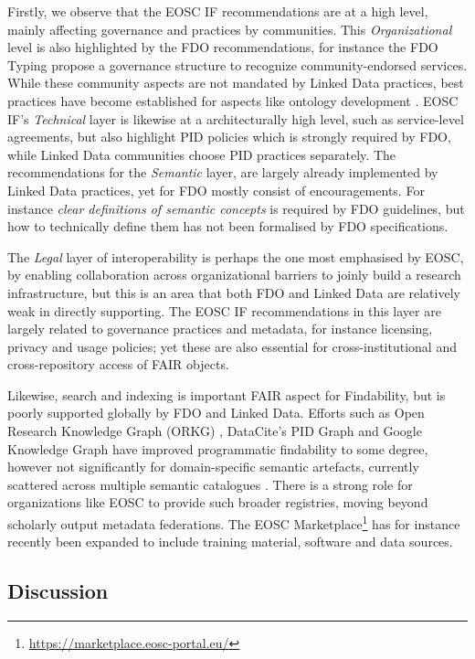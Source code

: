 Firstly, we observe that the EOSC IF recommendations are at a high level, mainly affecting governance and practices by communities. This \emph{Organizational} level is also highlighted by the FDO recommendations, for instance the FDO Typing \cite{Lannom 2022c} propose a governance structure to recognize community-endorsed services. While these community aspects are not mandated by Linked Data practices, best practices have become established for aspects like ontology development \cite{Norris 2021}. EOSC IF's \emph{Technical} layer is likewise at a architecturally high level, such as service-level agreements, but also highlight PID policies which is strongly required by FDO, while Linked Data communities choose PID practices separately. The recommendations for the \emph{Semantic} layer, are largely already implemented by Linked Data practices, yet for FDO mostly consist of encouragements. For instance \emph{clear definitions of semantic concepts} is required by FDO guidelines, but how to technically define them has not been formalised by FDO specifications. 

The \emph{Legal} layer of interoperability is perhaps the one most emphasised by EOSC, by enabling collaboration across organizational barriers to joinly build a research infrastructure, but this is an area that both FDO and Linked Data are relatively weak in directly supporting. The EOSC IF recommendations in this layer are largely related to governance practices and metadata, for instance licensing, privacy and usage policies; yet these are also essential for cross-institutional and cross-repository access of FAIR objects. 

Likewise, search and indexing is important FAIR aspect for Findability, but is poorly supported globally by FDO and Linked Data. Efforts such as Open Research Knowledge Graph (ORKG) \cite{Jaradeh 2019}, DataCite's PID Graph \cite{Fenner 2019} and Google Knowledge Graph \cite{Singhal 2012} have improved programmatic findability to some degree, however not significantly for domain-specific semantic artefacts, currently scattered across multiple semantic catalogues \cite{Corcho 2023}.  There is a strong role for organizations like EOSC to provide such broader registries, moving beyond scholarly output metadata federations. The EOSC Marketplace\footnote{\url{https://marketplace.eosc-portal.eu/}} has for instance recently been expanded to include training material, software and data sources.


\subsection{Discussion}\label{ch3:discussion}

